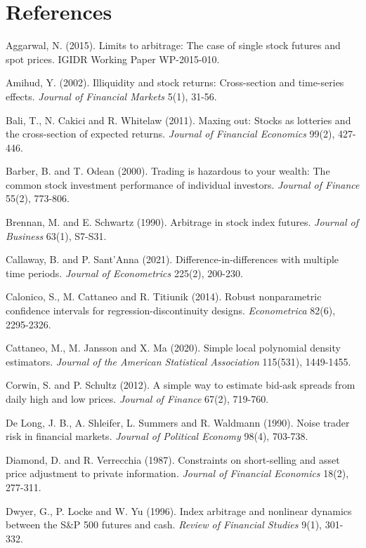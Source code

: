 \chapter*{References}
\small
\begin{description}[leftmargin=1.2em,itemsep=1pt,font=\normalfont]
\item Aggarwal, N. (2015). Limits to arbitrage: The case of single stock futures and spot prices. IGIDR Working Paper WP-2015-010.
\item Amihud, Y. (2002). Illiquidity and stock returns: Cross-section and time-series effects. \emph{Journal of Financial Markets} 5(1), 31-56.
\item Bali, T., N. Cakici and R. Whitelaw (2011). Maxing out: Stocks as lotteries and the cross-section of expected returns. \emph{Journal of Financial Economics} 99(2), 427-446.
\item Barber, B. and T. Odean (2000). Trading is hazardous to your wealth: The common stock investment performance of individual investors. \emph{Journal of Finance} 55(2), 773-806.
\item Brennan, M. and E. Schwartz (1990). Arbitrage in stock index futures. \emph{Journal of Business} 63(1), S7-S31.
\item Callaway, B. and P. Sant'Anna (2021). Difference-in-differences with multiple time periods. \emph{Journal of Econometrics} 225(2), 200-230.
\item Calonico, S., M. Cattaneo and R. Titiunik (2014). Robust nonparametric confidence intervals for regression-discontinuity designs. \emph{Econometrica} 82(6), 2295-2326.
\item Cattaneo, M., M. Jansson and X. Ma (2020). Simple local polynomial density estimators. \emph{Journal of the American Statistical Association} 115(531), 1449-1455.
\item Corwin, S. and P. Schultz (2012). A simple way to estimate bid-ask spreads from daily high and low prices. \emph{Journal of Finance} 67(2), 719-760.
\item De Long, J. B., A. Shleifer, L. Summers and R. Waldmann (1990). Noise trader risk in financial markets. \emph{Journal of Political Economy} 98(4), 703-738.
\item Diamond, D. and R. Verrecchia (1987). Constraints on short-selling and asset price adjustment to private information. \emph{Journal of Financial Economics} 18(2), 277-311.
\item Dwyer, G., P. Locke and W. Yu (1996). Index arbitrage and nonlinear dynamics between the S\&P 500 futures and cash. \emph{Review of Financial Studies} 9(1), 301-332.

\end{description}
